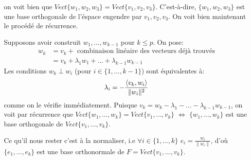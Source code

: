 \begin{preuve}
\[    \] 
    on voit bien que $Vect\{w_1, w_2, w_3\} = Vect\{v_1, v_2, v_3\}$. C'est-à-dire, $\{w_1, w_2, w_3\}$ est une base orthogonale de l'éspace engendre par $v_1, v_2, v_3$. On voit bien maintenant le procédé de récurrence.
    \par
    Supposons avoir construit $w_1, \ldots, w_{k-1}$ pour $k \le p$. On pose:
    \begin{align*}
        w_k &= v_k + \text{ combinaison linéaire des vecteurs déjà trouvés}\\
            &= v_k + \lambda_1w_1 + \ldots + \lambda_{k-1}w_{k-1}
    \end{align*}
    Les conditions $w_k \perp w_i$ (pour $i \in \{1, \ldots, k-1\}$) sont équivalentes à:
    \[
        \lambda_i = - \frac{\langle v_k, w_i \rangle}{\|w_i\|^2}
    \] 
    comme on le vérifie immédiatement. Puisque $v_k = w_k - \lambda_1 - \ldots - \lambda_{k-1}w_{k-1}$, on voit par récurrence que $Vect\{w_1, \ldots, w_k\} = Vect\{v_1, \ldots, v_k\}$ $\iff$ $\{w_1, \ldots, w_k\}$ est une base orthogonale de $Vect\{v_1, \ldots, v_k\}$.
    \par
    Ce qu'il nous rester c'est à la normaliser, i.e  $\forall i \in \{1, \ldots, k\}$ $e_i = \frac{w_i}{\|w_i\|}$, d'où $\{e_1, \ldots, e_k\}$ est une base orthonormale de $F = Vect\{v_1, \ldots, v_k\}$.
\end{preuve}
